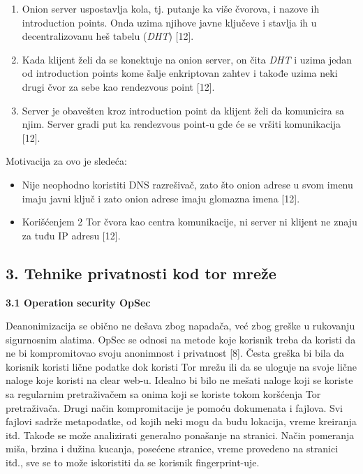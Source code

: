 \documentclass[
]{article}
\begin{document}
\begin{enumerate}
\def\labelenumi{\arabic{enumi}.}
\item
  Onion server uspostavlja kola, tj. putanje ka više čvorova, i nazove
  ih introduction points. Onda uzima njihove javne ključeve i stavlja ih
  u decentralizovanu heš tabelu (\emph{DHT}) {[}12{]}.
\item
  Kada klijent želi da se konektuje na onion server, on čita \emph{DHT}
  i uzima jedan od introduction points kome šalje enkriptovan zahtev i
  takođe uzima neki drugi čvor za sebe kao rendezvous point {[}12{]}.
\item
  Server je obavešten kroz introduction point da klijent želi da
  komunicira sa njim. Server gradi put ka rendezvous point-u gde će se
  vršiti komunikacija {[}12{]}.
\end{enumerate}

Motivacija za ovo je sledeća:

\begin{itemize}
\item
  Nije neophodno koristiti DNS razrešivač, zato što onion adrese u svom
  imenu imaju javni ključ i zato onion adrese imaju glomazna imena
  {[}12{]}.
\item
  Korišćenjem 2 Tor čvora kao centra komunikacije, ni server ni klijent
  ne znaju za tuđu IP adresu {[}12{]}.
\end{itemize}

\hypertarget{tehnike-privatnosti-kod-tor-mreux17ee}{%
\subsection{3. Tehnike privatnosti kod tor
mreže}\label{tehnike-privatnosti-kod-tor-mreux17ee}}

\protect\hypertarget{_Toc234141044}{}{}\textbf{3.1 Operation security
OpSec}

Deanonimizacija se obično ne dešava zbog napadača, već zbog greške u
rukovanju sigurnosnim alatima. OpSec se odnosi na metode koje korisnik
treba da koristi da ne bi kompromitovao svoju anonimnost i privatnost
{[}8{]}. Česta greška bi bila da korisnik koristi lične podatke dok
koristi Tor mrežu ili da se uloguje na svoje lične naloge koje koristi
na clear web-u. Idealno bi bilo ne mešati naloge koji se koriste sa
regularnim pretraživačem sa onima koji se koriste tokom koršćenja Tor
pretraživača. Drugi način kompromitacije je pomoću dokumenata i fajlova.
Svi fajlovi sadrže metapodatke, od kojih neki mogu da budu lokacija,
vreme kreiranja itd. Takođe se može analizirati generalno ponašanje na
stranici. Način pomeranja miša, brzina i dužina kucanja, posećene
stranice, vreme provedeno na stranici itd., sve se to može iskoristiti
da se korisnik fingerprint-uje.
\end{document}
